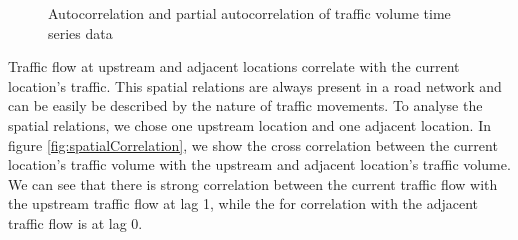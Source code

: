 \begin{figure}[h]
    \centering
    \qquad
    \caption[ACF and PACF]{Autocorrelation and partial autocorrelation of traffic volume time series data}
   \label{fig:trafficVolumeACFPACF}
\end{figure}

Traffic flow at upstream and adjacent locations correlate with the current location's traffic. This
spatial relations are always present in a road network and can be easily be described by the nature
of traffic movements. To analyse the spatial relations, we chose one upstream location and one
adjacent location. In figure \ref{fig:spatialCorrelation}, we show the cross correlation between the
current location's traffic volume with the upstream and adjacent location's traffic volume. We can see
that there is strong correlation between the current traffic flow with the upstream traffic flow
at lag 1, while the for correlation with the adjacent traffic flow is at lag 0.


